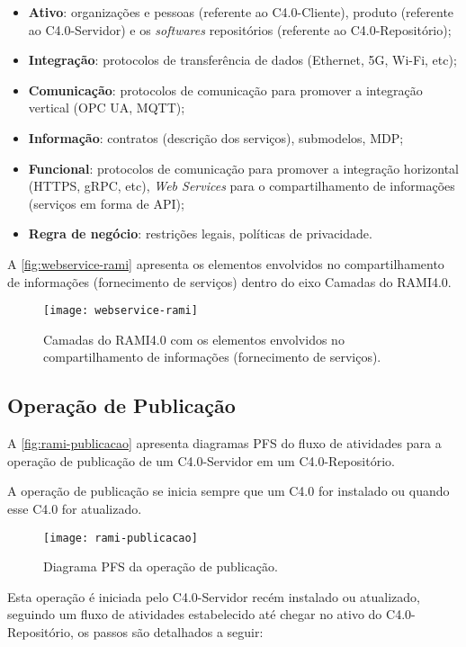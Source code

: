\begin{itemize}
	\item \textbf{Ativo}: organizações e pessoas (referente ao C4.0-Cliente), produto (referente ao C4.0-Servidor) e os \textit{softwares} repositórios (referente ao C4.0-Repositório);
	\item \textbf{Integração}: protocolos de transferência de dados (Ethernet, 5G, Wi-Fi, etc);
	\item \textbf{Comunicação}: protocolos de comunicação para promover a integração vertical (OPC UA, MQTT);
	\item \textbf{Informação}: contratos (descrição dos serviços), submodelos, MDP;
	\item \textbf{Funcional}: protocolos de comunicação para promover a integração horizontal (HTTPS, gRPC, etc), \textit{Web Services} para o compartilhamento de informações (serviços em forma de API);
	\item \textbf{Regra de negócio}: restrições legais, políticas de privacidade.
\end{itemize}

A \autoref{fig:webservice-rami} apresenta os elementos envolvidos no compartilhamento de informações (fornecimento de serviços) dentro do eixo Camadas do RAMI4.0.

\begin{figure}[H]
	\centering
	\texttt{[image: webservice-rami]}
	\caption{Camadas do RAMI4.0 com os elementos envolvidos no compartilhamento de informações (fornecimento de serviços).}
	\label{fig:webservice-rami}
\end{figure}

\subsection{Operação de Publicação}

A \autoref{fig:rami-publicacao} apresenta diagramas PFS do fluxo de atividades para a operação de publicação de um C4.0-Servidor em um C4.0-Repositório.

A operação de publicação se inicia sempre que um C4.0 for instalado ou quando esse C4.0 for atualizado.

\begin{figure}[htb]
	\centering
	\texttt{[image: rami-publicacao]}
	\caption{Diagrama PFS da operação de publicação.}
	\label{fig:rami-publicacao}
\end{figure}

Esta operação é iniciada pelo C4.0-Servidor recém instalado ou atualizado, seguindo um fluxo de atividades estabelecido até chegar no ativo do C4.0-Repositório, os passos são detalhados a seguir:

